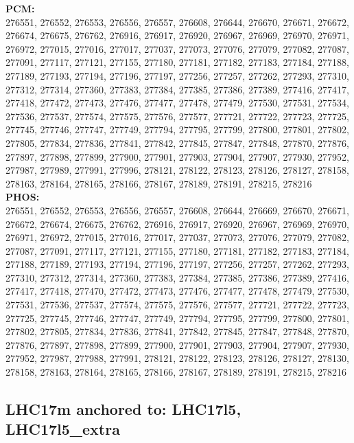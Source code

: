  \textbf{PCM:}\\
276551, 276552, 276553, 276556, 276557, 276608, 276644, 276670, 276671, 276672, 276674, 276675, 276762, 276916, 276917, 276920, 276967, 276969, 276970, 276971, 276972, 277015, 277016, 277017, 277037, 277073, 277076, 277079, 277082, 277087, 277091, 277117, 277121, 277155, 277180, 277181, 277182, 277183, 277184, 277188, 277189, 277193, 277194, 277196, 277197, 277256, 277257, 277262, 277293, 277310, 277312, 277314, 277360, 277383, 277384, 277385, 277386, 277389, 277416, 277417, 277418, 277472, 277473, 277476, 277477, 277478, 277479, 277530, 277531, 277534, 277536, 277537, 277574, 277575, 277576, 277577, 277721, 277722, 277723, 277725, 277745, 277746, 277747, 277749, 277794, 277795, 277799, 277800, 277801, 277802, 277805, 277834, 277836, 277841, 277842, 277845, 277847, 277848, 277870, 277876, 277897, 277898, 277899, 277900, 277901, 277903, 277904, 277907, 277930, 277952, 277987, 277989, 277991, 277996, 278121, 278122, 278123, 278126, 278127, 278158, 278163, 278164, 278165, 278166, 278167, 278189, 278191, 278215, 278216\\

 \textbf{PHOS:}\\
276551, 276552, 276553, 276556, 276557, 276608, 276644, 276669, 276670, 276671, 276672, 276674, 276675, 276762, 276916, 276917, 276920, 276967, 276969, 276970, 276971, 276972, 277015, 277016, 277017, 277037, 277073, 277076, 277079, 277082, 277087, 277091, 277117, 277121, 277155, 277180, 277181, 277182, 277183, 277184, 277188, 277189, 277193, 277194, 277196, 277197, 277256, 277257, 277262, 277293, 277310, 277312, 277314, 277360, 277383, 277384, 277385, 277386, 277389, 277416, 277417, 277418, 277470, 277472, 277473, 277476, 277477, 277478, 277479, 277530, 277531, 277536, 277537, 277574, 277575, 277576, 277577, 277721, 277722, 277723, 277725, 277745, 277746, 277747, 277749, 277794, 277795, 277799, 277800, 277801, 277802, 277805, 277834, 277836, 277841, 277842, 277845, 277847, 277848, 277870, 277876, 277897, 277898, 277899, 277900, 277901, 277903, 277904, 277907, 277930, 277952, 277987, 277988, 277991, 278121, 278122, 278123, 278126, 278127, 278130, 278158, 278163, 278164, 278165, 278166, 278167, 278189, 278191, 278215, 278216\\

 \subsection{LHC17m anchored to: LHC17l5, LHC17l5\_extra}

